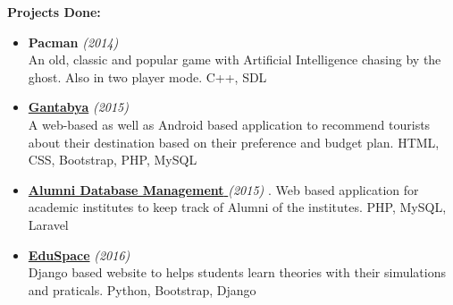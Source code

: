 \documentclass[hidelinks,a4paper, 12pt]{article}
\begin{document}
\vspace{8mm}

{\Large \textbf{Projects Done:} \\
}
\vspace{-5mm}
\begin{itemize}

	\item \textbf{Pacman } \emph{(2014)} \\
		\small An old, classic and popular game with Artificial Intelligence
		chasing by the ghost. Also in two player mode. C++, SDL
    \item \href{https://github.com/nac-gantabya/gantabya}{\textbf{Gantabya}} \emph{(2015)} \\
		\small A web-based as well as Android based application to recommend
		tourists about their destination based on their preference and budget
		plan. HTML, CSS, Bootstrap, PHP, MySQL
    \item \href{https://github.com/kritishpahi/SoftwareEngineering}{\textbf{Alumni Database Management} }\emph{(2015)}
		\small. Web based application for academic institutes to keep 
		track of Alumni of the institutes. PHP, MySQL, Laravel
    \item \href{https://github.com/kritishpahi/EduSpace}{\textbf{EduSpace}} \emph{(2016)} \\
		\small Django based website to helps students learn theories with
		their simulations and praticals. Python, Bootstrap, Django
\end{itemize}
\end{document}
